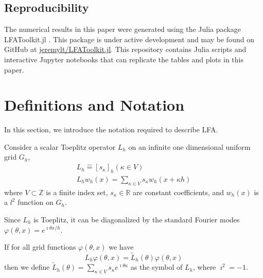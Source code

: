 \documentclass[review]{siamart190516}
\begin{document}
\subsection{Reproducibility}\label{sec:reproducibility}

The numerical results in this paper were generated using the Julia package LFAToolkit.jl \cite{thompson2021toolkit}.
This package is under active development and may be found on GitHub at \href{https://github.com/jeremylt/LFAToolkit.jl}{jeremylt/LFAToolkit.jl}.
This repository contains Julia scripts and interactive Jupyter notebooks that can replicate the tables and plots in this paper.

\section{Definitions and Notation}\label{sec:notation}

In this section, we introduce the notation required to describe LFA.

Consider a scalar Toeplitz operator $L_h$ on an infinite one dimensional uniform grid $G_h$,
\begin{equation}
\begin{split}
L_h \mathrel{\hat{=}} \left[ s_\kappa \right]_h \left( \kappa \in V \right)\\
L_h w_h \left( x \right) = \sum_{\kappa \in V} s_\kappa w_h \left( x + \kappa h \right)
\end{split}
\end{equation}
where $V \subset \mathbb{Z}$ is a finite index set, $s_\kappa \in \mathbb{R}$ are constant coefficients, and $w_h \left( x \right)$ is a $l^2$ function on $G_h$.

Since $L_h$ is Toeplitz, it can be diagonalized by the standard Fourier modes $\varphi \left( \theta, x \right) = e^{\imath \theta x / h}$.

\begin{definition}[Symbol of $L_h$]\label{def:symbol}
If for all grid functions $\varphi \left( \theta, x \right)$ we have
\begin{equation}
L_h \varphi \left( \theta, x \right) = \tilde{L}_h \left( \theta \right) \varphi \left( \theta, x \right)
\end{equation}
then we define $\tilde{L}_h \left( \theta \right) = \sum_{\kappa \in V} s_\kappa e^{\imath \theta \kappa}$ as the symbol of $L_h$, where $\imath^2 = -1$.
\end{definition}
\end{document}
